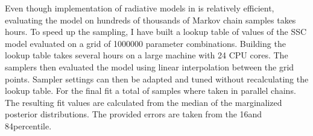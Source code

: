 Even though implementation of radiative models in \naima is relatively efficient, evaluating the model on hundreds of thousands of Markov chain samples 
takes hours. To speed up the sampling, I have built a lookup table of values of the SSC model evaluated on a grid of \num{1000000} parameter combinations.
Building the lookup table takes several hours on a large machine with 24 CPU cores.
The samplers then evaluated the model using linear interpolation between the grid points. Sampler settings can then be adapted 
and tuned without recalculating the lookup table. For the final fit a total of  samples 
where taken in  parallel chains.
The resulting fit values are calculated from the median of the marginalized posterior distributions. The provided errors 
are taken from the 16\th and 84\th percentile.

\begin{center}
\end{center}

